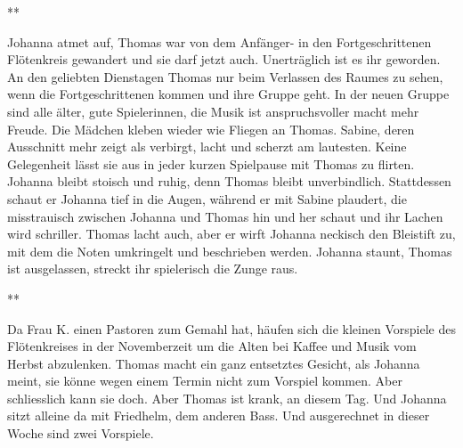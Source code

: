 \documentclass[10pt,a5paper]{book}
\newcommand{\sterne}{\par{\centering ***\par}}
\begin{document}
\sterne


Johanna atmet auf, Thomas war von dem Anfänger- in den Fortgeschrittenen Flötenkreis gewandert und sie darf jetzt auch. Unerträglich ist es ihr geworden. An den geliebten Dienstagen Thomas nur beim Verlassen des Raumes zu sehen, wenn die Fortgeschrittenen kommen und ihre Gruppe geht.
In der neuen Gruppe sind alle älter, gute Spielerinnen, die Musik ist anspruchsvoller macht mehr Freude. Die Mädchen kleben wieder wie Fliegen an Thomas. Sabine, deren Ausschnitt mehr zeigt als verbirgt, lacht und scherzt am lautesten. Keine Gelegenheit lässt sie aus in jeder kurzen Spielpause mit Thomas zu flirten. Johanna bleibt stoisch und ruhig, denn Thomas bleibt unverbindlich. Stattdessen schaut er Johanna tief in die Augen, während er mit Sabine plaudert, die misstrauisch zwischen Johanna und Thomas hin und her schaut und ihr Lachen wird schriller. Thomas lacht auch, aber er wirft Johanna neckisch den Bleistift zu, mit dem die Noten umkringelt und beschrieben werden. Johanna staunt, Thomas ist ausgelassen, streckt ihr spielerisch die Zunge raus.



\sterne


Da Frau K. einen Pastoren zum Gemahl  hat, häufen sich die kleinen Vorspiele des Flötenkreises  in der Novemberzeit um die Alten bei Kaffee und Musik vom Herbst abzulenken. Thomas macht ein ganz entsetztes Gesicht, als Johanna meint, sie könne wegen einem Termin nicht zum Vorspiel kommen. Aber schliesslich kann sie doch. Aber Thomas ist krank, an diesem Tag. Und Johanna sitzt alleine da mit Friedhelm, dem anderen Bass. Und ausgerechnet in dieser Woche sind zwei Vorspiele.
\end{document}
